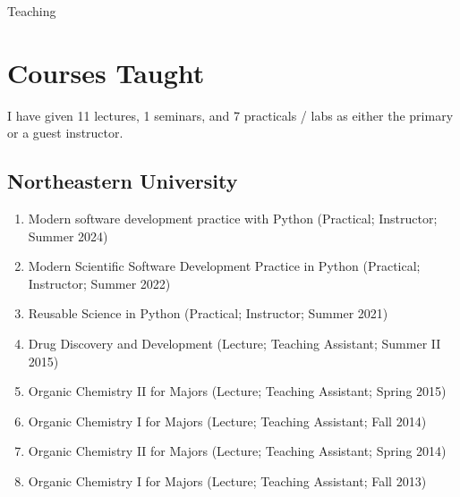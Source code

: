 \documentclass[10pt,a4paper,sans]{moderncv} %
\begin{document}
\pagebreak
{\huge Teaching}

    \section{Courses Taught}

    I have given 11 lectures,
    1 seminars,
    and 7 practicals / labs
    as either the primary or a guest instructor.

        \subsection{Northeastern University}
        \begin{enumerate}
        \item     Modern software development practice with Python (Practical; Instructor; Summer 2024)

        \item     Modern Scientific Software Development Practice in Python (Practical; Instructor; Summer 2022)

        \item     Reusable Science in Python (Practical; Instructor; Summer 2021)

        \item     Drug Discovery and Development (Lecture; Teaching Assistant; Summer II 2015)

        \item     Organic Chemistry II for Majors (Lecture; Teaching Assistant; Spring 2015)

        \item     Organic Chemistry I for Majors (Lecture; Teaching Assistant; Fall 2014)

        \item     Organic Chemistry II for Majors (Lecture; Teaching Assistant; Spring 2014)

        \item     Organic Chemistry I for Majors (Lecture; Teaching Assistant; Fall 2013)

        \end{enumerate}
\end{document}
